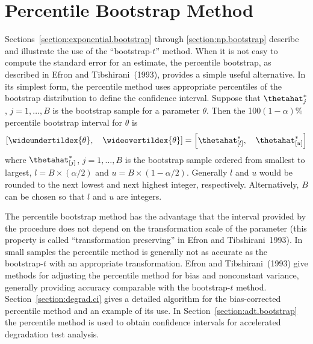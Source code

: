 \section{Percentile Bootstrap Method}
\label{section:percentile.bootstrap}
Sections~\ref{section:exponential.bootstrap} through
\ref{section:np.bootstrap} describe and illustrate the
use of the ``bootstrap-$t$'' method.  When it is not
easy to compute the standard error for an estimate, the percentile
bootstrap, as described in Efron and Tibshirani~(1993), provides a
simple useful alternative. In its simplest form, the percentile
method uses appropriate percentiles of the bootstrap distribution to
define the confidence interval.  Suppose that $\thetahat^{*}_{j}$,
$j=1,\ldots , B$ is the bootstrap sample for a parameter
$\theta$. Then the 100$(1-\alpha)$\% percentile bootstrap interval
for $\theta$ is
\begin{displaymath}
\left[ \wideundertildex{\theta}, \quad
\wideovertildex{\theta} \right] = 
\left[\thetahat^{*}_{[l]},  \quad
\thetahat^{*}_{[u]} \right]
\end{displaymath}
where $\thetahat^{*}_{[j]}$, $j=1,\ldots , B$ is the bootstrap sample
ordered from smallest to largest, $l=B \times (\alpha/2)$ and $u=B
\times (1-\alpha/2)$. Generally $l$ and $u$ would be rounded to the
next lowest and next highest integer, respectively. Alternatively, $B$
can be chosen so that $l$ and $u$ are integers.

The percentile bootstrap method has the advantage that the interval
provided by the procedure does not depend on the transformation scale
of the parameter 
(this property is called
``transformation preserving'' in Efron and Tibshirani~1993).  In small
samples the percentile method is generally not as accurate as the
bootstrap-$t$ with an appropriate transformation. Efron and
Tibshirani~(1993) give methods for adjusting the percentile method for
bias and nonconstant variance, generally providing accuracy comparable
with the bootstrap-$t$ method. Section~\ref{section:degrad.ci} gives a
detailed algorithm for the bias-corrected percentile method and an
example of its use.  In Section~\ref{section:adt.bootstrap} the
percentile method is used to obtain confidence intervals for
accelerated degradation test analysis.
